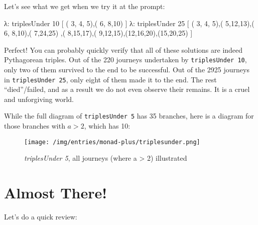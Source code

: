 \documentclass[]{article}
\newenvironment{Shaded}{}{}
\newcommand{\DecValTok}[1]{\textcolor[rgb]{0.25,0.63,0.44}{{#1}}}
\newcommand{\FunctionTok}[1]{\textcolor[rgb]{0.02,0.16,0.49}{{#1}}}
\newcommand{\NormalTok}[1]{{#1}}
\begin{document}
Let's see what we get when we try it at the prompt:

\begin{Shaded}
\begin{Highlighting}[]
\NormalTok{λ}\FunctionTok{:} \NormalTok{triplesUnder }\DecValTok{10}
\NormalTok{[ ( }\DecValTok{3}\NormalTok{, }\DecValTok{4}\NormalTok{, }\DecValTok{5}\NormalTok{),( }\DecValTok{6}\NormalTok{, }\DecValTok{8}\NormalTok{,}\DecValTok{10}\NormalTok{) ]}
\NormalTok{λ}\FunctionTok{:} \NormalTok{triplesUnder }\DecValTok{25}
\NormalTok{[ ( }\DecValTok{3}\NormalTok{, }\DecValTok{4}\NormalTok{, }\DecValTok{5}\NormalTok{),( }\DecValTok{5}\NormalTok{,}\DecValTok{12}\NormalTok{,}\DecValTok{13}\NormalTok{),( }\DecValTok{6}\NormalTok{, }\DecValTok{8}\NormalTok{,}\DecValTok{10}\NormalTok{),( }\DecValTok{7}\NormalTok{,}\DecValTok{24}\NormalTok{,}\DecValTok{25}\NormalTok{)}
 \NormalTok{,( }\DecValTok{8}\NormalTok{,}\DecValTok{15}\NormalTok{,}\DecValTok{17}\NormalTok{),( }\DecValTok{9}\NormalTok{,}\DecValTok{12}\NormalTok{,}\DecValTok{15}\NormalTok{),(}\DecValTok{12}\NormalTok{,}\DecValTok{16}\NormalTok{,}\DecValTok{20}\NormalTok{),(}\DecValTok{15}\NormalTok{,}\DecValTok{20}\NormalTok{,}\DecValTok{25}\NormalTok{) ]}
\end{Highlighting}
\end{Shaded}

Perfect! You can probably quickly verify that all of these solutions are indeed Pythagorean triples.
Out of the 220 journeys undertaken by \texttt{triplesUnder\ 10}, only two of them survived to the
end to be successful. Out of the 2925 journeys in \texttt{triplesUnder\ 25}, only eight of them made
it to the end. The rest ``died''/failed, and as a result we do not even observe their remains. It is
a cruel and unforgiving world.

While the full diagram of \texttt{triplesUnder\ 5} has 35 branches, here is a diagram for those
branches with \(a > 2\), which has 10:

\begin{figure}[htbp]
\centering
\texttt{[image: /img/entries/monad-plus/triplesunder.png]}
\caption{\emph{triplesUnder 5}, all journeys (where a \textgreater{} 2) illustrated}
\end{figure}

\section{Almost There!}\label{almost-there}

Let's do a quick review:
\end{document}
